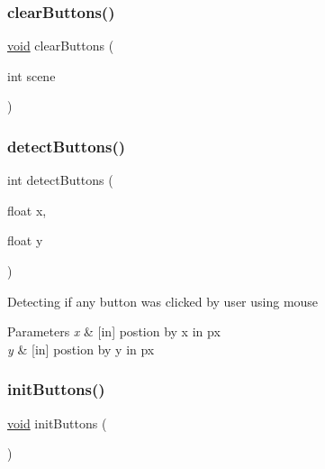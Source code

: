 \subsubsection{\texorpdfstring{clear\+Buttons()}{clearButtons()}}
{\footnotesize\ttfamily \hyperlink{png_8h_ac9c84fa68bbad002983e35ce3663c686}{void} clear\+Buttons (\begin{DoxyParamCaption}\item[{int}]{scene }\end{DoxyParamCaption})}

\mbox{\label{group___button_ga010fb433acfc05067bb55db843d9d0c1}} 
\subsubsection{\texorpdfstring{detect\+Buttons()}{detectButtons()}}
{\footnotesize\ttfamily int detect\+Buttons (\begin{DoxyParamCaption}\item[{float}]{x,  }\item[{float}]{y }\end{DoxyParamCaption})}

Detecting if any button was clicked by user using mouse 
\begin{DoxyParams}{Parameters}
{\em x} & \mbox{[}in\mbox{]} postion by x in px \\
\hline
{\em y} & \mbox{[}in\mbox{]} postion by y in px \\
\hline
\end{DoxyParams}
\mbox{\label{group___button_ga27d3ba5afb772cc36c9a432c28975ace}} 
\subsubsection{\texorpdfstring{init\+Buttons()}{initButtons()}}
{\footnotesize\ttfamily \hyperlink{png_8h_ac9c84fa68bbad002983e35ce3663c686}{void} init\+Buttons (\begin{DoxyParamCaption}{ }\end{DoxyParamCaption})}

\mbox{\label{group___button_gaec4b418c3f627ef7860290712740c425}} 
